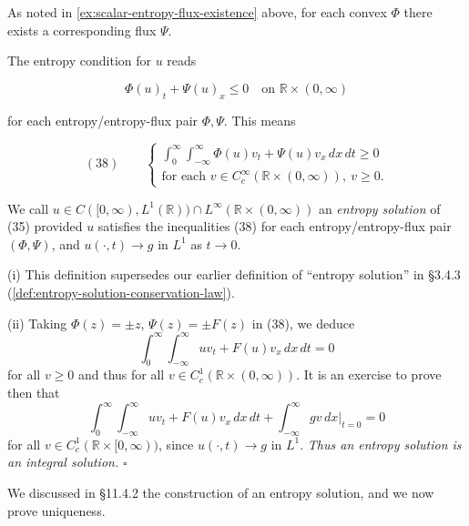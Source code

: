 As noted in \cref{ex:scalar-entropy-flux-existence} above, for each convex $\Phi$ there exists a corresponding flux $\Psi$.

The entropy condition for $u$ reads

$$\Phi(u)_t + \Psi(u)_x \leq 0 \quad \text{on } \mathbb{R}\times(0,\infty)$$

for each entropy/entropy-flux pair $\Phi,\Psi$. This means

$$(38) \qquad \left\{\begin{array}{l} \int_0^\infty\int_{-\infty}^\infty \Phi(u)v_t + \Psi(u)v_x\,dx\,dt \geq 0 \\ \text{for each } v\in C_c^\infty(\mathbb{R}\times(0,\infty)), \ v\geq 0. \end{array}\right.$$

\begin{definition}
\label{def:entropy-solution-scalar-new}
We call $u\in C([0,\infty), L^1(\mathbb{R}))\cap L^\infty(\mathbb{R}\times(0,\infty))$ an \textit{entropy solution} of (35) provided $u$ satisfies the inequalities (38) for each entropy/entropy-flux pair $(\Phi,\Psi)$, and $u(\cdot,t)\to g$ in $L^1$ as $t\to 0$.
\end{definition}

\begin{remark}
\label{rem:entropy-solution-scalar-consistency}
(i) This definition supersedes our earlier definition of ``entropy solution'' in \S3.4.3 (\cref{def:entropy-solution-conservation-law}).

(ii) Taking $\Phi(z)=\pm z$, $\Psi(z)=\pm F(z)$ in (38), we deduce
$$\int_0^\infty\int_{-\infty}^\infty uv_t + F(u)v_x\,dx\,dt = 0$$
for all $v\geq 0$ and thus for all $v\in C_c^1(\mathbb{R}\times(0,\infty))$. It is an exercise to prove then that
$$\int_0^\infty\int_{-\infty}^\infty uv_t + F(u)v_x\,dx\,dt + \int_{-\infty}^\infty gv\,dx\Big|_{t=0} = 0$$
for all $v\in C_c^1(\mathbb{R}\times[0,\infty))$, since $u(\cdot,t)\to g$ in $L^1$. \textit{Thus an entropy solution is an integral solution.} $\square$
\end{remark}

We discussed in \S11.4.2 the construction of an entropy solution, and we now prove uniqueness.

